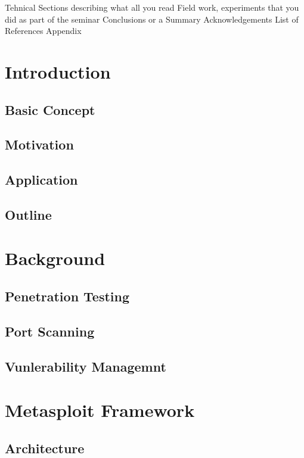 \documentclass[11pt, a4paper]{report}
\begin{document}
\pagestyle{plain}
\def\title{Metasploit Framework}
\def\what{Seminar}
\def\who{Saurabh Jambhule}
\def\guide{Prof. G. Sivakumar}

\titlpage
\tableofcontents
\listoffigures


\newpage
{}


Tehnical Sections describing what all you read
Field work, experiments that you did as part of the seminar Conclusions or a Summary
Acknowledgements
List of References
Appendix


\chapter{Introduction}
\section{Basic Concept}
\section{Motivation}
\section{Application}
\section{Outline}


\chapter{Background}
\section{Penetration Testing}
\section{Port Scanning}
\section{Vunlerability Managemnt}

\chapter{Metasploit Framework}
\section{Architecture}
\end{document}
